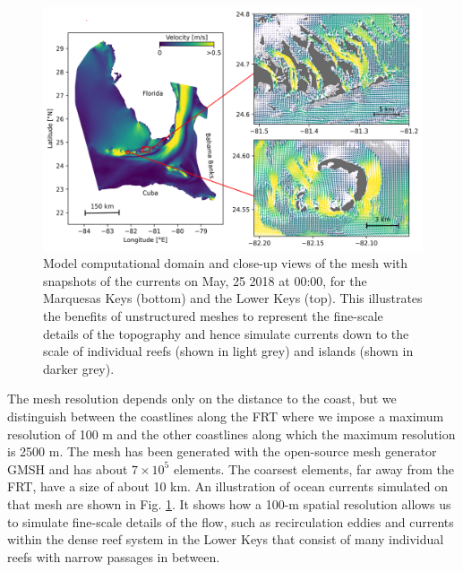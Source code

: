 \documentclass[utf8]{frontiersSCNS}
\begin{document}
\begin{figure}
    \centering
    \includegraphics[width=.95\textwidth]{figures/vel.png}
    \caption{Model computational domain and close-up views of the mesh with snapshots of the currents on May, 25 2018 at 00:00, for the Marquesas Keys (bottom) and the Lower Keys (top). This illustrates the benefits of unstructured meshes to represent the fine-scale details of the topography and hence simulate currents down to the scale of individual reefs (shown in light grey) and islands (shown in darker grey).}
    \label{fig:setup}
\end{figure}

The mesh resolution depends only on the distance to the coast, but we distinguish between the coastlines along the FRT where we impose a maximum resolution of 100 m and the other coastlines along which the maximum resolution is 2500 m. The mesh has been generated with the open-source mesh generator GMSH \citep{Geuzaine2009} and has about $7 \times 10^5$ elements. The coarsest elements, far away from the FRT, have a size of about 10 km. An illustration of ocean currents simulated on that mesh are shown in Fig. \ref{fig:setup}. It shows how a 100-m spatial resolution allows us to simulate fine-scale details of the flow, such as recirculation eddies and currents within the dense reef system in the Lower Keys that consist of many individual reefs with narrow passages in between. 
\end{document}

